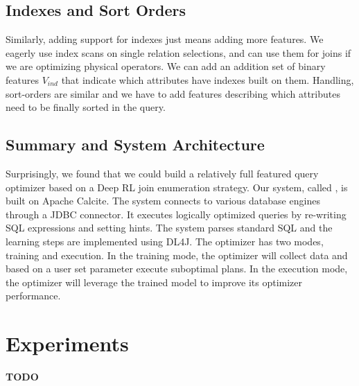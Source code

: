 \subsection*{Indexes and Sort Orders}
Similarly, adding support for indexes just means adding more features. We eagerly use index scans on single relation selections, and can use them for joins if we are optimizing physical operators. We can add an addition set of binary features $V_{ind}$ that indicate which attributes have indexes built on them. Handling, sort-orders are similar and we have to add features describing which attributes need to be finally sorted in the query.

\subsection*{Summary and System Architecture}
Surprisingly, we found that we could build a relatively full featured query optimizer based on a Deep RL join enumeration strategy.
Our system, called \qsys, is built on Apache Calcite.
The system connects to various database engines through a JDBC connector. It executes logically optimized queries by re-writing SQL expressions and setting hints.
The system parses standard SQL and the learning steps are implemented using \textsf{DL4J}.
The optimizer has two modes, training and execution. In the training mode, the optimizer will collect data and based on a user set parameter execute suboptimal plans. In the execution mode, the optimizer will leverage the trained model to improve its optimizer performance.

\section{Experiments}
\textbf{TODO}
